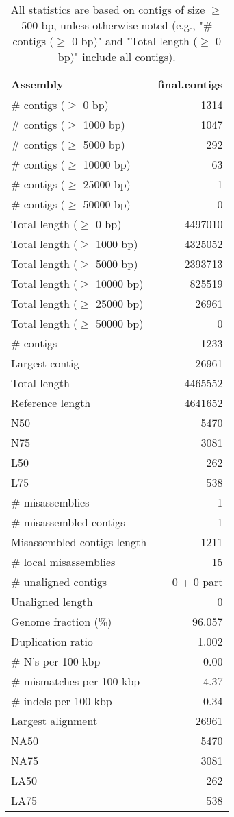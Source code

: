 \documentclass[12pt,a4paper]{article}
\begin{document}
\begin{table}[ht]
\begin{center}
\caption{All statistics are based on contigs of size $\geq$ 500 bp, unless otherwise noted (e.g., "\# contigs ($\geq$ 0 bp)" and "Total length ($\geq$ 0 bp)" include all contigs).}
\begin{tabular}{|l*{1}{|r}|}
\hline
Assembly & final.contigs \\ \hline
\# contigs ($\geq$ 0 bp) & 1314 \\ \hline
\# contigs ($\geq$ 1000 bp) & 1047 \\ \hline
\# contigs ($\geq$ 5000 bp) & 292 \\ \hline
\# contigs ($\geq$ 10000 bp) & 63 \\ \hline
\# contigs ($\geq$ 25000 bp) & 1 \\ \hline
\# contigs ($\geq$ 50000 bp) & 0 \\ \hline
Total length ($\geq$ 0 bp) & 4497010 \\ \hline
Total length ($\geq$ 1000 bp) & 4325052 \\ \hline
Total length ($\geq$ 5000 bp) & 2393713 \\ \hline
Total length ($\geq$ 10000 bp) & 825519 \\ \hline
Total length ($\geq$ 25000 bp) & 26961 \\ \hline
Total length ($\geq$ 50000 bp) & 0 \\ \hline
\# contigs & 1233 \\ \hline
Largest contig & 26961 \\ \hline
Total length & 4465552 \\ \hline
Reference length & 4641652 \\ \hline
N50 & 5470 \\ \hline
N75 & 3081 \\ \hline
L50 & 262 \\ \hline
L75 & 538 \\ \hline
\# misassemblies & 1 \\ \hline
\# misassembled contigs & 1 \\ \hline
Misassembled contigs length & 1211 \\ \hline
\# local misassemblies & 15 \\ \hline
\# unaligned contigs & 0 + 0 part \\ \hline
Unaligned length & 0 \\ \hline
Genome fraction (\%) & 96.057 \\ \hline
Duplication ratio & 1.002 \\ \hline
\# N's per 100 kbp & 0.00 \\ \hline
\# mismatches per 100 kbp & 4.37 \\ \hline
\# indels per 100 kbp & 0.34 \\ \hline
Largest alignment & 26961 \\ \hline
NA50 & 5470 \\ \hline
NA75 & 3081 \\ \hline
LA50 & 262 \\ \hline
LA75 & 538 \\ \hline
\end{tabular}
\end{center}
\end{table}
\end{document}
